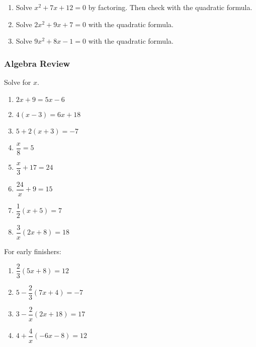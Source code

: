 \documentclass[12pt, oneside]{article}
\begin{document}
      \begin{enumerate}
        \item Solve $x^2+7x+12=0$ by factoring. Then check with the quadratic formula. \vspace{4cm}
        \item Solve $2x^2+9x+7=0$ with the quadratic formula. \vspace{4cm}
        \item Solve $9x^2+8x-1=0$ with the quadratic formula. \vspace{4cm}
      \end{enumerate}
      \newpage
      \subsubsection*{Algebra Review}
      Solve for $x$.
      \begin{multicols}{2}
        \begin{enumerate}
          \item $2x+9=5x-6$ \vspace{4cm}
          \item $4(x - 3) = 6x + 18$ \vspace{4cm}
          \item $5 + 2(x + 3) = -7$ \vspace{4cm}
          \item $\dfrac{x}{8}=5$ \vspace{4cm}
          \item $\dfrac{x}{3}+17=24$ \vspace{4cm}
          \item $\dfrac{24}{x}+9=15$ \vspace{4cm}
          \item $\dfrac{1}{2}(x + 5)=7$ \vspace{4cm}
          \item $\dfrac{3}{x}(2x + 8)=18$ \vspace{4cm}
        \end{enumerate}
      \end{multicols}
      \pagebreak
      For early finishers:
      \begin{multicols}{2}
      \begin{enumerate}
        \item $\dfrac{2}{3}(5x+8)=12$ \vspace{7cm}
        \item $5 - \dfrac{2}{3}(7x+4)= -7$ \vspace{7cm}
        \item $3 - \dfrac{2}{x}(2x+18) = 17$ \vspace{7cm}
        \item $4 + \dfrac{4}{x}(-6x-8) = 12$ \vspace{7cm}
      \end{enumerate}
    \end{multicols}
\end{document}
